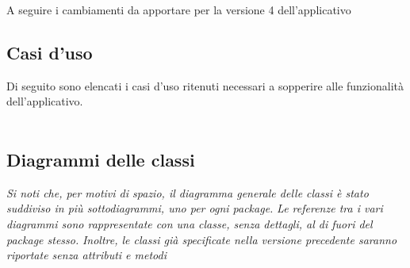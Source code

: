 A seguire i cambiamenti da apportare per la versione 4 dell'applicativo

\subsection{Casi d'uso}
Di seguito sono elencati i casi d'uso ritenuti necessari a sopperire alle funzionalità
dell'applicativo.
\\\\






\pagebreak


\pagebreak
\subsection{Diagrammi delle classi}

\textit{Si noti che, per motivi di spazio, il diagramma generale delle classi è stato suddiviso in più sottodiagrammi, uno per ogni package.}
\textit{Le referenze tra i vari diagrammi sono rappresentate con una classe, senza dettagli, al di fuori del package stesso.}
\textit{Inoltre, le classi già specificate nella versione precedente saranno riportate senza attributi e metodi}



